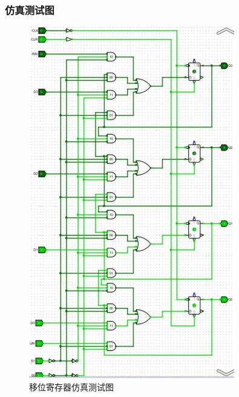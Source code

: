 \documentclass{article}
\begin{document}
    \subsubsection{仿真测试图}
    \begin{figure}[H]
    \centering
    \includegraphics[width=0.8\textwidth]{3.5.1.png}
    \caption{移位寄存器仿真测试图}
    \end{figure}
\end{document}
